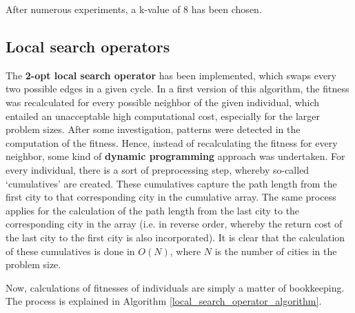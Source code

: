 \documentclass[a4paper,10pt]{article}
\newcommand{\ReplaceMe}[1]{{\color{blue}#1}}
\begin{document}
After numerous experiments, a k-value of 8 has been chosen.

\subsection{Local search operators}
\label{local_search_operator}
The \textbf{2-opt local search operator} has been implemented, which swaps every two possible edges in a given cycle. In a first version of this algorithm, the fitness was recalculated for every possible neighbor of the given individual, which entailed an unacceptable high computational cost, especially for the larger problem sizes. After some investigation, patterns were detected in the computation of the fitness. Hence, instead of recalculating the fitness for every neighbor, some kind of \textbf{dynamic programming} approach was undertaken. For every individual, there is a sort of preprocessing step, whereby so-called `cumulatives' are created. These cumulatives capture the path length from the first city to that corresponding city in the cumulative array. The same process applies for the calculation of the path length from the last city to the corresponding city in the array (i.e. in reverse order, whereby the return cost of the last city to the first city is also incorporated). It is clear that the calculation of these cumulatives is done in $O(N)$, where $N$ is the number of cities in the problem size.

Now, calculations of fitnesses of individuals are simply a matter of bookkeeping. The process is explained in Algorithm \ref{local_search_operator_algorithm}.

\end{document}
